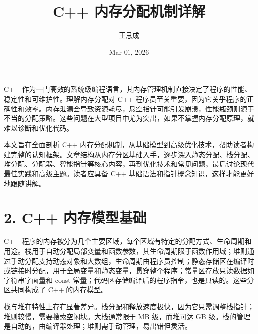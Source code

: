 \title{C++ 内存分配机制详解}
\author{王思成}
\date{Mar 01, 2026}
\maketitle
C++ 作为一门高效的系统级编程语言，其内存管理机制直接决定了程序的性能、稳定性和可维护性。理解内存分配对 C++ 程序员至关重要，因为它关乎程序的正确性和效率。内存泄漏会导致资源耗尽，悬空指针可能引发崩溃，性能瓶颈则源于不当的分配策略。这些问题在大型项目中尤为突出，如果不掌握内存分配原理，就难以诊断和优化代码。\par
本文旨在全面剖析 C++ 内存分配机制，从基础模型到高级优化技术，帮助读者构建完整的认知框架。文章结构从内存分区基础入手，逐步深入静态分配、栈分配、堆分配、分配器、智能指针等核心内容，再到优化技术和常见问题，最后讨论现代最佳实践和高级主题。读者应具备 C++ 基础语法和指针概念知识，这样才能更好地跟随讲解。\par
\chapter{2. C++ 内存模型基础}
C++ 程序的内存被分为几个主要区域，每个区域有特定的分配方式、生命周期和用途。栈用于自动分配局部变量和函数参数，其生命周期限于函数作用域；堆则通过手动分配支持动态对象和大数组，生命周期由程序员控制；静态存储区在编译时或链接时分配，用于全局变量和静态变量，贯穿整个程序；常量区存放只读数据如字符串字面量和 const 常量；代码区存储编译后的程序指令，也是只读的。这些分区共同构成了 C++ 的内存模型。\par
栈与堆在特性上存在显著差异。栈分配和释放速度极快，因为它只需调整栈指针；堆则较慢，需要搜索空闲块。大栈通常限于 MB 级，而堆可达 GB 级。栈的管理是自动的，由编译器处理；堆则需手动管理，易出错但灵活。\par
